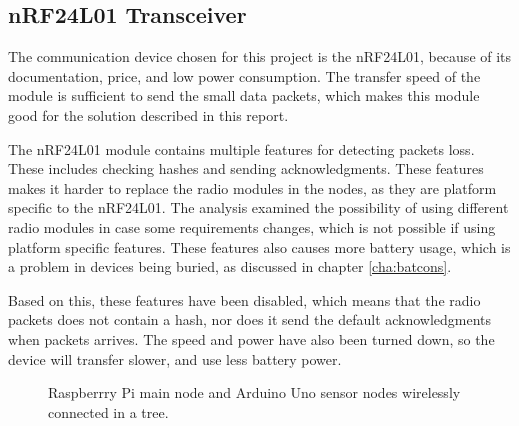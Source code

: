 \subsection{nRF24L01 Transceiver}
The communication device chosen for this project is the nRF24L01, because of its documentation, price, and low power consumption. The transfer speed of the module is sufficient to send the small data packets, which makes this module good for the solution described in this report.

The nRF24L01 module contains multiple features for detecting packets loss. These includes checking hashes and sending acknowledgments\cite{nf24datasheet}. These features makes it harder to replace the radio modules in the nodes, as they are platform specific to the nRF24L01. The analysis examined the possibility of using different radio modules in case some requirements changes, which is not possible if using platform specific features. These features also causes more battery usage, which is a problem in devices being buried, as discussed in chapter \ref{cha:batcons}.

Based on this, these features have been disabled, which means that the radio packets does not contain a hash, nor does it send the default acknowledgments when packets arrives. The speed and power have also been turned down, so the device will transfer slower, and use less battery power.

\begin{figure}[!h]
	\centering
	\caption{Raspberrry Pi main node and Arduino Uno sensor nodes wirelessly connected in a tree.}
	\label{fig:raspbuinoTree}
\end{figure}

